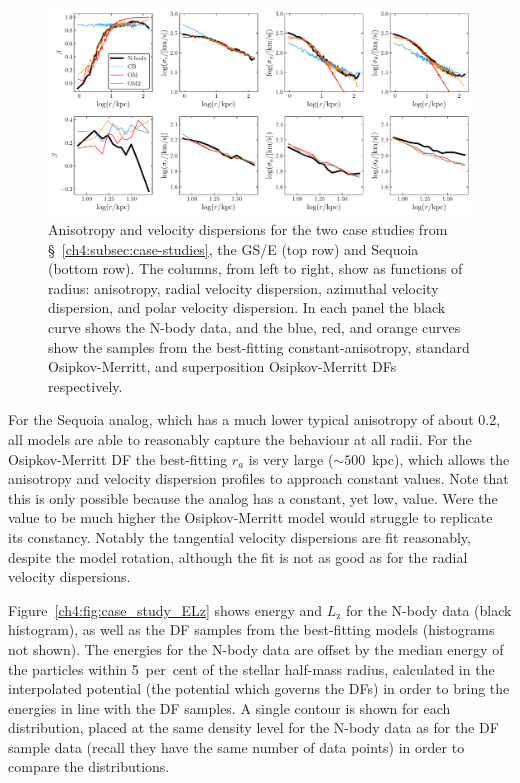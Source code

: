 \begin{figure}
    \centering
    \includegraphics[width=\textwidth]{figure/ch4/beta_vdisp.pdf}
    \caption{Anisotropy and velocity dispersions for the two case studies from \S~\ref{ch4:subsec:case-studies}, the GS/E (top row) and Sequoia (bottom row). The columns, from left to right, show as functions of radius: anisotropy, radial velocity dispersion, azimuthal velocity dispersion, and polar velocity dispersion. In each panel the black curve shows the N-body data, and the blue, red, and orange curves show the samples from the best-fitting constant-anisotropy, standard Osipkov-Merritt, and superposition Osipkov-Merritt DFs respectively.}
    \label{ch4:fig:case_study_beta_vdisp}
\end{figure}

For the Sequoia analog, which has a much lower typical anisotropy of about 0.2, all models are able to reasonably capture the behaviour at all radii. For the Osipkov-Merritt DF the best-fitting $r_{a}$ is very large ($\sim 500$~kpc), which allows the anisotropy and velocity dispersion profiles to approach constant values. Note that this is only possible because the analog has a constant, yet low, value. Were the value to be much higher the Osipkov-Merritt model would struggle to replicate its constancy. Notably the tangential velocity dispersions are fit reasonably, despite the model rotation, although the fit is not as good as for the radial velocity dispersions.

Figure~\ref{ch4:fig:case_study_ELz} shows energy and $L_\mathrm{z}$ for the N-body data (black histogram), as well as the DF samples from the best-fitting models (histograms not shown). The energies for the N-body data are offset by the median energy of the particles within 5~per~cent of the stellar half-mass radius, calculated in the interpolated potential (the potential which governs the DFs) in order to bring the energies in line with the DF samples. A single contour is shown for each distribution, placed at the same density level for the N-body data as for the DF sample data (recall they have the same number of data points) in order to compare the distributions.

